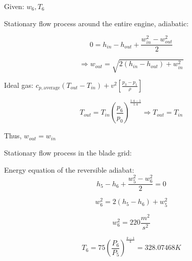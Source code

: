Given: \( w_6, T_6 \)

Stationary flow process around the entire engine, adiabatic:

\[
0 = h_{in} - h_{out} + \frac{w_{in}^2 - w_{out}^2}{2}
\]

\[
\Rightarrow w_{out} = \sqrt{2(h_{in} - h_{out}) + w_{in}^2}
\]

Ideal gas: \( c_{p, \text{average}} (T_{out} - T_{in}) + v^2 \left[ \frac{p_3 - p_1}{\rho} \right] \)

\[
T_{out} = T_{in} \left( \frac{p_6}{p_0} \right)^{\frac{1.4 - 1}{1.4}} \Rightarrow T_{out} = T_{in}
\]

Thus, \( w_{out} = w_{in} \)

Stationary flow process in the blade grid:

Energy equation of the reversible adiabat:
\[
h_5 - h_6 + \frac{w_5^2 - w_6^2}{2} = 0
\]

\[
w_6^2 = 2(h_5 - h_6) + w_5^2
\]

\[
w_6^2 = 220 \frac{m^2}{s^2}
\]

\[
T_6 = 75 \left( \frac{P_6}{P_5} \right)^{\frac{k-1}{k}} = 328.07468 K
\]